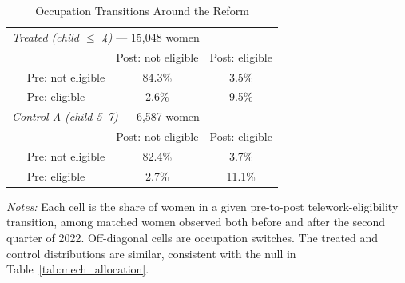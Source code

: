 \begin{table}[H]\centering
\caption{Occupation Transitions Around the Reform}
\label{tab:occ_transition}\small
\begin{tabular}{lcc}
\toprule
\multicolumn{3}{l}{\textit{Treated (child $\leq$ 4)} --- 15,048 women} \\
 & Post: not eligible & Post: eligible \\
$\quad$ Pre: not eligible & 84.3\% & 3.5\% \\
$\quad$ Pre: eligible & 2.6\% & 9.5\% \\
\midrule
\multicolumn{3}{l}{\textit{Control A (child 5--7)} --- 6,587 women} \\
 & Post: not eligible & Post: eligible \\
$\quad$ Pre: not eligible & 82.4\% & 3.7\% \\
$\quad$ Pre: eligible & 2.7\% & 11.1\% \\
\bottomrule\end{tabular}
\par\vspace{3pt}\footnotesize\raggedright \textit{Notes:} Each cell is the share of women in a given pre-to-post telework-eligibility transition, among matched women observed both before and after the second quarter of 2022. Off-diagonal cells are occupation switches. The treated and control distributions are similar, consistent with the null in Table~\ref{tab:mech_allocation}.
\end{table}
